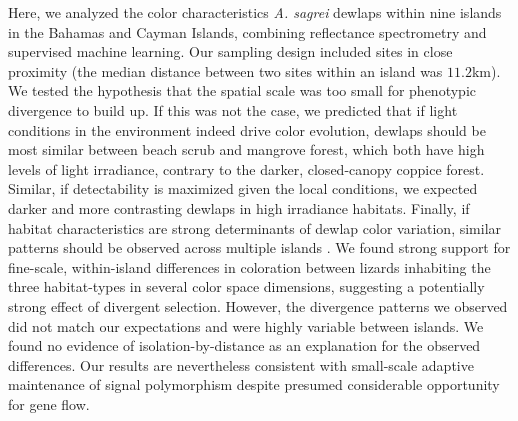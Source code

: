 Here, we analyzed the color characteristics \textit{A. sagrei} dewlaps within nine islands in the Bahamas and Cayman Islands, combining reflectance spectrometry and supervised machine learning. Our sampling design included sites in close proximity (the median distance between two sites within an island was $11.2$km). We tested the hypothesis that the spatial scale was too small for phenotypic divergence to build up. If this was not the case, we predicted that if light conditions in the environment indeed drive color evolution, dewlaps should be most similar between beach scrub and mangrove forest, which both have high levels of light irradiance, contrary to the darker, closed-canopy coppice forest. Similar, if detectability is maximized given the local conditions, we expected darker and more contrasting dewlaps in high irradiance habitats. Finally, if habitat characteristics are strong determinants of dewlap color variation, similar patterns should be observed across multiple islands \citep{Losos2011}. We found strong support for fine-scale, within-island differences in coloration between lizards inhabiting the three habitat-types in several color space dimensions, suggesting a potentially strong effect of divergent selection. However, the divergence patterns we observed did not match our expectations and were highly variable between islands. We found no evidence of isolation-by-distance as an explanation for the observed differences. Our results are nevertheless consistent with small-scale adaptive maintenance of signal polymorphism despite presumed considerable opportunity for gene flow.




